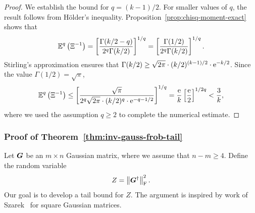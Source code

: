 \documentclass[final]{siamltex}
\begin{document}
\begin{appendix}
\begin{proof}
We establish the bound for $q = (k-1)/2$.  For smaller values of
$q$, the result follows from H{\"o}lder's inequality.
Proposition~\ref{prop:chisq-moment-exact} shows that
$$
\operatorname{\mathbb{E}}^q \left(\Xi^{-1}\right)
    = \left[ \frac{\Gamma(k/2-q)}{2^q \Gamma(k/2)} \right]^{1/q}
    = \left[ \frac{\Gamma(1/2)}{2^q \Gamma(k/2)} \right]^{1/q}.
$$
Stirling's approximation ensures that
$\Gamma(k/2) \geq \sqrt{2\pi} \cdot (k/2)^{(k-1)/2} \cdot \mathrm{e}^{-k/2}$.
Since the value $\Gamma(1/2) = \sqrt{\pi}$, %
$$
\operatorname{\mathbb{E}}^q \left(\Xi^{-1}\right)
    \leq \left[ \frac{\sqrt{\pi}}{2^q\sqrt{2\pi}\cdot (k/2)^{q}\cdot \mathrm{e}^{-q-1/2}} \right]^{1/q}
    = \frac{\mathrm{e}}{k} \left[ \frac{\mathrm{e}}{2} \right]^{1/2q}
    < \frac{3}{k},
$$
where we used the assumption $q \geq 2$ to complete the numerical estimate.
\end{proof}

\subsubsection{Proof of Theorem~\ref{thm:inv-gauss-frob-tail}}

Let $\bm{G}$ be an $m \times n$ Gaussian matrix, where we assume that
$n - m \geq 4$.  Define the random variable
$$
Z = \left\Vert {\bm{G}^\dagger} \right\Vert_{\mathrm{F}}^2.
$$
Our goal is to develop a tail bound for $Z$.  The argument is inspired
by work of Szarek~\cite[\S6]{Sza90:Spaces-Large} for square Gaussian matrices.


\end{appendix}
\end{document}
